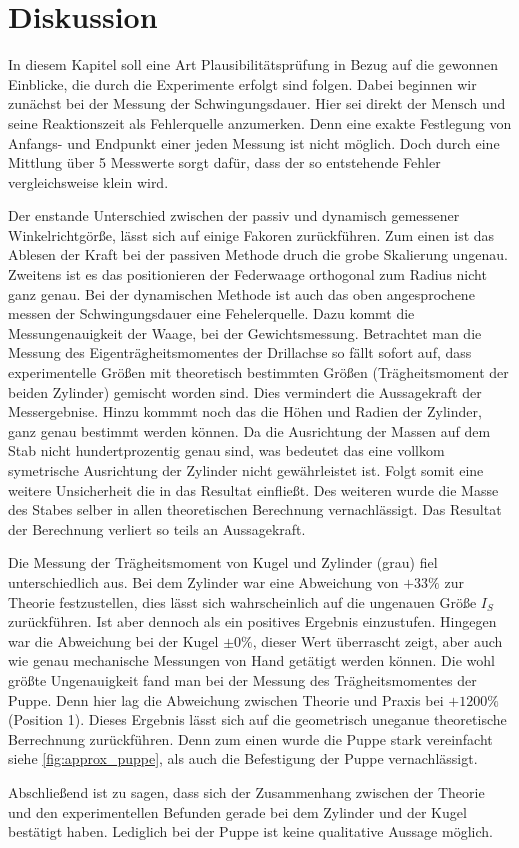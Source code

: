 \section{Diskussion}
In diesem Kapitel soll eine Art Plausibilitätsprüfung in Bezug auf die
gewonnen Einblicke, die durch die Experimente erfolgt sind folgen.
Dabei beginnen wir zunächst bei der Messung der Schwingungsdauer.
Hier sei direkt der Mensch und seine Reaktionszeit als Fehlerquelle anzumerken. 
Denn eine exakte Festlegung von Anfangs- und Endpunkt einer jeden Messung ist 
nicht möglich. %
Doch durch eine Mittlung 
über 5 Messwerte sorgt dafür, dass der so entstehende Fehler vergleichsweise klein wird.

Der enstande Unterschied zwischen der passiv und dynamisch gemessener Winkelrichtgörße,
lässt sich auf einige Fakoren zurückführen.
Zum einen ist das Ablesen der Kraft bei der passiven Methode 
druch die grobe Skalierung ungenau. 
Zweitens ist es das positionieren der Federwaage orthogonal zum Radius
nicht ganz genau. 
Bei der dynamischen Methode ist auch das oben angesprochene messen der Schwingungsdauer 
eine Fehelerquelle.
Dazu kommt die Messungenauigkeit der Waage, bei der Gewichtsmessung. 
Betrachtet man die Messung des Eigenträgheitsmomentes der Drillachse so fällt sofort auf, 
dass experimentelle Größen mit theoretisch bestimmten Größen (Trägheitsmoment der beiden Zylinder) 
gemischt worden sind. 
Dies vermindert die Aussagekraft der Messergebnise.
Hinzu kommmt noch das die  Höhen und Radien der Zylinder, ganz genau bestimmt werden können.
Da die Ausrichtung der Massen auf dem Stab nicht hundertprozentig genau sind, was 
bedeutet das eine vollkom symetrische Ausrichtung  der Zylinder nicht gewährleistet ist. 
Folgt somit eine weitere Unsicherheit die in das Resultat einfließt.
Des weiteren wurde die Masse des Stabes selber in allen theoretischen Berechnung vernachlässigt.
Das Resultat der Berechnung verliert so teils an Aussagekraft.

Die Messung der Trägheitsmoment von Kugel und Zylinder (grau) fiel unterschiedlich aus.
Bei dem Zylinder war eine Abweichung von $+33\%$ zur Theorie festzustellen, 
dies lässt sich wahrscheinlich auf die ungenauen Größe $I_S$ zurückführen.
Ist aber dennoch als ein positives Ergebnis einzustufen.
Hingegen war die Abweichung bei der Kugel $\pm 0\%$, dieser Wert überrascht zeigt,
aber auch wie genau mechanische Messungen von Hand getätigt werden können.
Die wohl größte Ungenauigkeit fand man bei der Messung des Trägheitsmomentes der Puppe. 
Denn hier lag die Abweichung zwischen Theorie und Praxis bei
$+1200\%$ (Position 1). Dieses Ergebnis lässt sich auf die 
geometrisch uneganue theoretische Berrechnung zurückführen.
Denn zum einen wurde die Puppe stark vereinfacht siehe \ref{fig:approx_puppe}, als auch
die Befestigung der Puppe vernachlässigt.  %

Abschließend ist zu sagen, dass sich der Zusammenhang zwischen der Theorie und den experimentellen Befunden
gerade bei dem Zylinder und der Kugel bestätigt haben.
Lediglich bei der Puppe ist keine qualitative Aussage möglich.